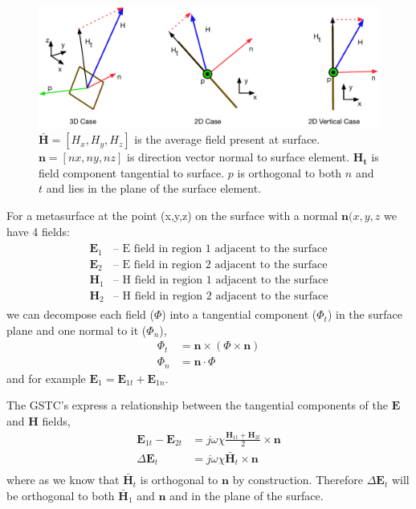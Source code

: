 \documentclass{article}
\newcommand{\E}{\mathbf{E}}
\renewcommand{\H}{\mathbf{H}}
\newcommand{\Hb}{\mathbf{\bar H}}
\newcommand{\n}{\mathbf{n}}
\newcommand{\Ht}{\mathbf{H_t}}
\newcommand{\DE}{\Delta \E}
\renewcommand{\H}{\mathbf{H}}
\newcommand{\0}{\varnothing}
\begin{document}
\begin{figure}[htbp]
\begin{center}
\includegraphics[width=1\columnwidth]{figures/SurfGeo}
\caption{$\Hb = [H_x,H_y,H_z]$ is the average field present at surface. $\n = [nx,ny,nz]$ is direction vector normal to surface element. $\Ht$ is field component tangential to surface. $p$ is orthogonal to both $n$ and $t$ and lies in the plane of the surface element.}\label{Fig:Surface Geo}
\end{center}
\end{figure}


For a metasurface at the point (x,y,z) on the surface with a normal $\n(x,y,z$ we have 4 fields:
\begin{align*}
\begin{array}{cc}
	\E_1 & \text{-- E field in region 1 adjacent to the surface}\\
	\E_2 & \text{-- E field in region 2 adjacent to the surface}\\
	\H_1 & \text{-- H field in region 1 adjacent to the surface}\\
	\H_2 & \text{-- H field in region 2 adjacent to the surface}
\end{array}
\end{align*}
we can decompose each field ($\Phi$) into a tangential component ($\Phi_t$) in the surface plane and one normal to it ($\Phi_n$),
\begin{align*}
\Phi_t &= \n \times (\Phi \times \n) \\
\Phi_n &= \n \cdot \Phi
\end{align*}
and for example $\E_1 = \E_{1t} + \E_{1n}$.

The GSTC's express a relationship between the tangential components of the $\E$ and $\H$ fields,
\begin{align*}
    \E_{1t} - \E_{2t}  &= j \omega \chi \frac{\H_{1t} + \H_{2t}}{2} \times \n\\
    \DE_{t}  &= j \omega \chi  \Hb_t \times \n\\
\end{align*}
where as we know that $\Hb_t$ is orthogonal to $\n$ by construction. Therefore $\DE_{t}$ will be orthogonal to both $\Hb_1$ and $\n$ and in the plane of the surface. 
\end{document}
